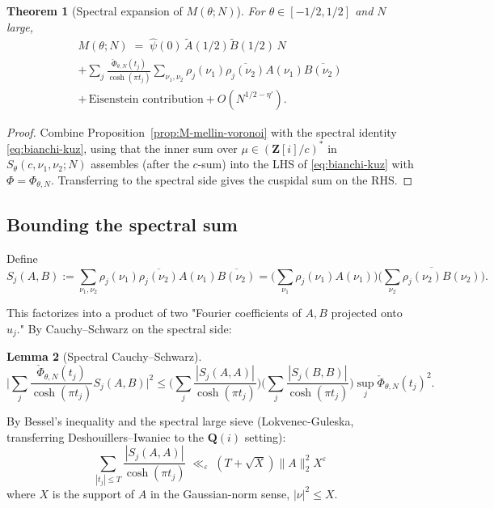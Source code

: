 \documentclass[11pt]{article}
\newtheorem{theorem}{Theorem}[section]
\newtheorem{lemma}[theorem]{Lemma}
\theoremstyle{definition}
\newcommand{\Z}{\mathbf{Z}}
\newcommand{\Q}{\mathbf{Q}}
\newcommand{\Zi}{\Z[i]}
\begin{document}
\begin{theorem}[Spectral expansion of $M(\theta;N)$]\label{thm:M-spectral}
For $\theta\in[-1/2,1/2]$ and $N$ large,
\begin{multline}\label{eq:M-spectral-full}
M(\theta;N)\;=\;\widehat\psi(0)\,\widetilde A(1/2)\widetilde B(1/2)\,N\\
+\sum_j\frac{\check\Phi_{\theta,N}(t_j)}{\cosh(\pi t_j)}\sum_{\nu_1,\nu_2}\rho_j(\nu_1)\overline{\rho_j(\nu_2)}A(\nu_1)\overline{B(\nu_2)}\\
+\,\text{Eisenstein contribution}+O(N^{1/2-\eta'}).
\end{multline}
\end{theorem}

\begin{proof}
Combine Proposition~\ref{prop:M-mellin-voronoi} with the spectral identity \eqref{eq:bianchi-kuz}, using that the inner sum over $\mu\in(\Zi/c)^*$ in $S_\theta(c,\nu_1,\nu_2;N)$ assembles (after the $c$-sum) into the LHS of \eqref{eq:bianchi-kuz} with $\Phi=\Phi_{\theta,N}$. Transferring to the spectral side gives the cuspidal sum on the RHS.
\end{proof}

\subsection{Bounding the spectral sum}

Define
\[
S_j(A,B):=\sum_{\nu_1,\nu_2}\rho_j(\nu_1)\overline{\rho_j(\nu_2)}A(\nu_1)\overline{B(\nu_2)}=\Big(\sum_{\nu_1}\rho_j(\nu_1)A(\nu_1)\Big)\overline{\Big(\sum_{\nu_2}\rho_j(\nu_2)B(\nu_2)\Big)}.
\]

This factorizes into a product of two "Fourier coefficients of $A,B$ projected onto $u_j$." By Cauchy--Schwarz on the spectral side:

\begin{lemma}[Spectral Cauchy--Schwarz]\label{lem:spec-CS}
\[
\Big|\sum_j\frac{\check\Phi_{\theta,N}(t_j)}{\cosh(\pi t_j)}S_j(A,B)\Big|^2\le\Big(\sum_j\frac{|S_j(A,A)|}{\cosh(\pi t_j)}\Big)\Big(\sum_j\frac{|S_j(B,B)|}{\cosh(\pi t_j)}\Big)\sup_j\check\Phi_{\theta,N}(t_j)^2.
\]
\end{lemma}

By Bessel's inequality and the spectral large sieve (Lokvenec-Guleska, transferring Deshouillers--Iwaniec to the $\Q(i)$ setting):
\[
\sum_{|t_j|\le T}\frac{|S_j(A,A)|}{\cosh(\pi t_j)}\;\ll_\varepsilon\;(T+\sqrt X)\|A\|_2^2 X^\varepsilon
\]
where $X$ is the support of $A$ in the Gaussian-norm sense, $|\nu|^2\le X$.
\end{document}
